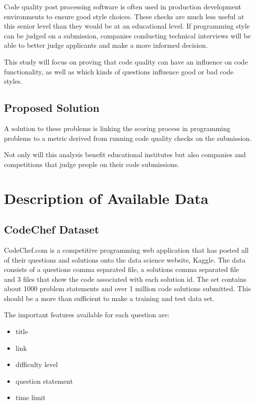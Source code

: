 \documentclass{article}
\begin{document}
Code quality post processing software is often used in production
development environments to ensure good style choices. These checks are
much less useful at this senior level than they would be at an
educational level. If programming style can be judged on a submission,
companies conducting technical interviews will be able to better judge
applicants and make a more informed decision.

This study will focus on proving that code quality can have an influence
on code functionality, as well as which kinds of questions influence
good or bad code styles.

\subsection{Proposed Solution}\label{proposed-solution}

A solution to these problems is linking the scoring process in
programming problems to a metric derived from running code quality
checks on the submission.

Not only will this analysis benefit educational institutes but also
companies and competitions that judge people on their code submissions.

\section{Description of Available
Data}\label{description-of-available-data}

\subsection{CodeChef Dataset}\label{codechef-dataset}

CodeChef.com is a competitive programming web application that has
posted all of their questions and solutions onto the data science
website, Kaggle. The data consists of a questions comma separated file,
a solutions comma separated file and 3 files that show the code
associated with each solution id. The set contains about 1000 problem
statements and over 1 million code solutions submitted. This should be a
more than sufficient to make a training and test data set.

The important features available for each question are:

\begin{itemize}
\item
  title
\item
  link
\item
  difficulty level
\item
  question statement
\item
  time limit
\end{itemize}
\end{document}
